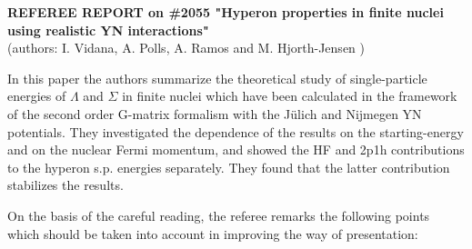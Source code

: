 \setlength{\textheight}{23cm}

\begin{center}
  {\bf REFEREE REPORT on \#2055 "Hyperon properties in finite nuclei 
  using realistic YN interactions"}\\
   (authors: I. Vidana, A. Polls, A. Ramos and M. Hjorth-Jensen )
\end{center}
\vspace{0.5cm} 
In this paper the authors summarize the theoretical study of 
single-particle energies of $\Lambda$ and $\Sigma$ in finite 
nuclei which have been calculated in the framework of the second 
order G-matrix formalism with the J\"ulich and Nijmegen YN potentials. 
They investigated the dependence of the results on the starting-energy 
and on the nuclear Fermi momentum, and showed the HF and 2p1h 
contributions to the hyperon s.p. energies separately. They found 
that the latter contribution stabilizes the results. 

On the basis of the careful reading, the referee remarks the following 
points which should be taken into account in improving the way of 
presentation:

